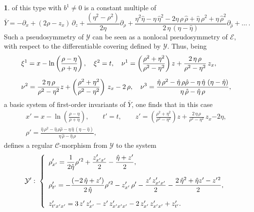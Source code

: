 \documentclass[12pt,english]{elsarticle}
\theoremstyle{plain}
\theoremstyle{plain}
\theoremstyle{remark}
\theoremstyle{plain}
\theoremstyle{definition}
\theoremstyle{definition}
\newtheorem{example}[thm]{\protect\examplename}
\providecommand{\examplename}{Example}
\begin{document}
\begin{example}
of this type with $b^{1}\neq 0$ is a constant multiple of
%
\begin{equation*}
\bar{Y}={\displaystyle -\partial _{x}+(2\rho -z_{x})\,\partial _{z}+
\frac{\left (\eta ^{2}-\rho ^{2}\right )}{2\eta}\partial _{\rho}+
\frac{\eta ^{2}\hat{\eta}-\eta \,\hat{\eta}^{2}-2\eta \,\rho \,\hat{\rho}+\hat{\eta}\,\rho ^{2}+\eta \,\hat{\rho}^{2}}{2\,\eta \,\left (\eta -\hat{\eta}\right )}
\partial _{\hat{\rho}}+\ldots \,.}
\end{equation*}
%
Such a pseudosymmetry of $\mathcal{Y}$ can be seen as a nonlocal pseudosymmetry
of $\mathcal{E}$, with respect to the differentiable covering defined by
$\mathcal{Y}$. Thus, being
%
\begin{equation*}
%
\begin{array}{l}
{\displaystyle \xi ^{1}=x-\ln \left (\frac{\rho -\eta}{\rho +\eta}
\right ),\quad \xi ^{2}=t,\quad \nu ^{1}=\left (
\frac{\rho ^{2}+\eta ^{2}}{\rho ^{2}-\eta ^{2}}\right )z+
\frac{2\,\eta \,\rho}{\rho ^{2}-\eta ^{2}}\,z_{x},}
\vspace{10pt}
\\
{\displaystyle \nu ^{2}=\frac{2\,\eta \,\rho}{\rho ^{2}-\eta ^{2}}z+
\left (\frac{\rho ^{2}+\eta ^{2}}{\rho ^{2}-\eta ^{2}}\right )\,z_{x}-2\,\rho,
\quad \nu ^{3}=
\frac{\hat{\eta}\,\rho ^{2}-\hat{\eta}\,\rho \hat{\rho}-\eta \,\hat{\eta}\,\left (\eta -\hat{\eta}\right )}{\eta \,\hat{\rho}-\hat{\eta}\,\rho},}
\end{array}
%
\end{equation*}
%
a basic system of first-order invariants of $\bar{Y}$, one finds
that in this case
%
\begin{eqnarray}[ll]
\nonumber
x'=x-\ln \left (\frac{\rho -\eta}{\rho +\eta}\right ),\qquad t'=t,
\qquad z'=\left (\frac{\rho ^{2}+\eta ^{2}}{\rho ^{2}-\eta ^{2}}
\right )z+\frac{2\,\eta \,\rho}{\rho ^{2}-\eta ^{2}}\,z_{x}{
-2\eta},\\ \rho '=
\frac{\hat{\eta}\,\rho ^{2}-\hat{\eta}\,\rho \hat{\rho}-\eta \,\hat{\eta}\,\left (\eta -\hat{\eta}\right )}{\eta \,\hat{\rho}-\hat{\eta}\,\rho},
\label{eq:ABT-CH-1}
\end{eqnarray}
%
defines a regular $\mathcal{C}$-morphism from $\mathcal{Y}$ to the system
%
\begin{equation*}
\mathcal{Y}':\;\left \{
%
\begin{array}{l}
{\displaystyle \rho '_{x'}=\frac{1}{2\hat{\eta}}\rho '{}^{2}+
\frac{z'_{x'x'}}{2}-\frac{{\hat{\eta}}+z'}{2},}
\vspace{10pt}
\\
{\displaystyle \rho '_{t'}=-
\frac{\left (-2\,\hat{\eta} +z'\right )}{2\,\hat{\eta}}\rho '{}^{2}-z'_{x'}\,
\rho '-\frac{z'\,z'_{x'x'}}{2}-
\frac{2\,\hat{\eta} ^{2}+\hat{\eta} z'-z'{}^{2}}{2}},
\vspace{10pt}
\\
z'_{t'x'x'}=3\,z'\,z'_{x'}-z'\,z'_{x'x'x'}-2\,z'_{x'}\,z'_{x'x'}+z'_{t'}.
\end{array}
%
\right .
\end{equation*}
%
 \end{example}
\end{document}
